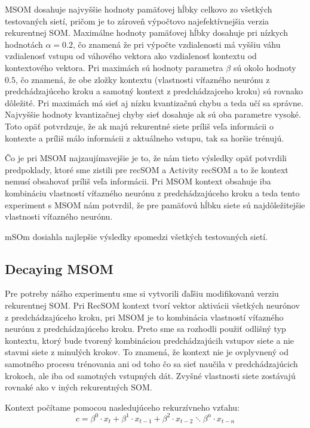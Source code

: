  MSOM dosahuje najvyššie hodnoty pamäťovej hĺbky celkovo zo všetkých testovaných sietí, pričom je to zároveň 
 výpočtovo najefektívnejšia verzia rekurentnej SOM. 
 Maximálne hodnoty pamäťovej hĺbky dosahuje pri nízkych hodnotách $\alpha = 0.2 $, čo znamená že pri výpočte vzdialenosti má vyššiu váhu vzdialenosť vstupu od 
 váhového vektora ako vzdialenosť kontextu od kontextového vektora. 
 Pri maximách sú hodnoty parametra $\beta$ sú okolo hodnoty $0.5$, čo znamená, že obe zložky kontextu 
 (vlastnosti víťazného neurónu z predchádzajúceho kroku a samotný kontext z predchádzajceho kroku) sú rovnako dôležité.
 Pri maximách má sieť aj nízku kvantizačnú chybu a teda učí sa správne. 
 Najvyššie hodnoty kvantizačnej chyby sieť dosahuje ak sú oba parametre vysoké. Toto opäť potvrdzuje, že ak majú rekurentné
 siete príliš veľa informácii o kontexte a príliš málo informácii z aktuálneho vstupu, tak sa horšie trénujú.


 Čo je pri MSOM najzaujímavejšie je to, že nám tieto výsledky opäť potvrdili predpoklady, ktoré sme zistili pre recSOM a Activity recSOM a to že
 kontext nemusí obsahovať príliš veľa informácii. Pri MSOM kontext obsahuje iba kombináciu vlastností víťazného neurónu z predchádzajúceho kroku a teda tento 
 experiment s MSOM nám potvrdil, že pre pamäťovú hĺbku siete sú najdôležitejšie vlastnosti víťazného neurónu.

 mSOm dosiahla najlepšie výsledky spomedzi všetkých testovaných sietí.



\subsection{Decaying MSOM}
Pre potreby nášho experimentu sme si vytvorili ďaľšiu modifikovanú verziu %
rekurentnej SOM. Pri RecSOM kontext tvorí vektor aktivácii všetkých neurónov z predchádzajúceho kroku, 
pri MSOM je to kombinácia vlastností víťazného neurónu z predchádzajúceho kroku. 
Preto sme sa rozhodli použiť odlišný typ kontextu, ktorý bude tvorený kombináciou predchádzajúcih vstupov 
siete a nie stavmi siete z minulých krokov. To znamená, že kontext nie je ovplyvnený od samotného procesu trénovania
ani od toho čo sa sieť naučila v predchádzajúcich krokoch, ale iba od samotných vstupných dát.
Zvyšné vlastnosti siete zostávajú rovnaké ako v iných rekurentných SOM.

Kontext počítame pomocou nasledujúceho rekurzívneho vzťahu:
\begin{equation}
	c = \beta^{0} \cdot x_{t} + \beta^{1} \cdot x_{t-1} + 
	\beta^{2} \cdot x_{t-2} \ddots \beta^{n} \cdot x_{t-n}
\end{equation}

